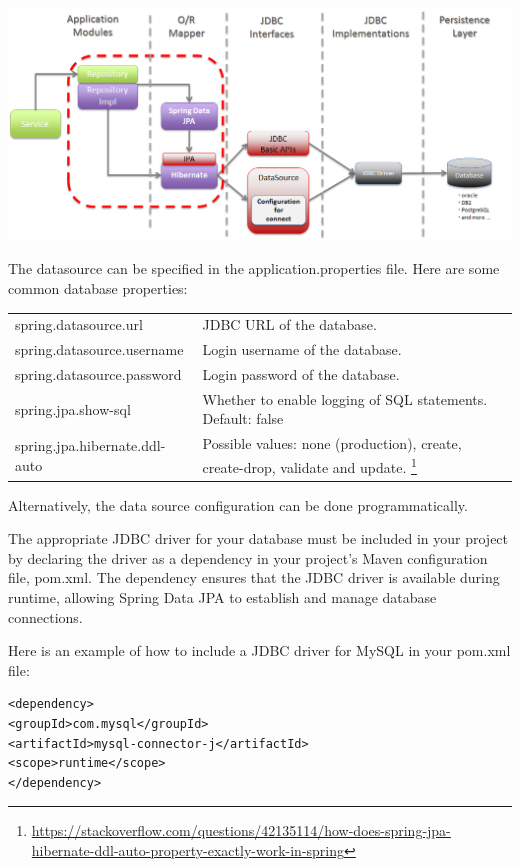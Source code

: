 \includegraphics[width=\textwidth]{./images/chapter-jpa/springdatajpa}

The datasource can be specified in the application.properties file.
Here are some common database properties:

\begin{tabular}{|l|p{8cm}|}
\hline
spring.datasource.url & JDBC URL of the database.\\
spring.datasource.username & Login username of the database.\\
spring.datasource.password & Login password of the database.\\
spring.jpa.show-sql & Whether to enable logging of SQL statements. Default: false\\
spring.jpa.hibernate.ddl-auto & Possible values: none (production), create, create-drop, validate and update. \footnote{\url{https://stackoverflow.com/questions/42135114/how-does-spring-jpa-hibernate-ddl-auto-property-exactly-work-in-spring}}\\
\hline
\end{tabular}

Alternatively, the data source configuration can be done programmatically.

The appropriate JDBC driver for your database must be included in your project by declaring the driver as a dependency in your project's Maven configuration file, pom.xml. The dependency ensures that the JDBC driver is available during runtime, allowing Spring Data JPA to establish and manage database connections.

Here is an example of how to include a JDBC driver for MySQL in your pom.xml file:

\begin{lstlisting}
<dependency>
<groupId>com.mysql</groupId>
<artifactId>mysql-connector-j</artifactId>
<scope>runtime</scope>
</dependency>
\end{lstlisting}


